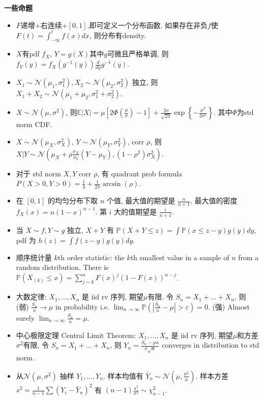 \documentclass[UTF8]{ctexart}
\begin{document}
\noindent \textbf{一些命题}
\begin{itemize}

\item $F$递增+右连续+$[0,1]$,即可定义一个分布函数.
	如果存在非负$f$使$F(t)=\int_{-\infty}^t f(x)dx$, 则分布有density.

\item $X$有pdf $f_X$, $Y=g(X)$其中$g$可微且严格单调, 则$f_Y(y)=f_X(g^{-1}(y))\frac{d}{dy}g^{-1}(y)$.

\item $X_1\sim \mathcal{N}(\mu_1,\sigma_1^2), X_2\sim \mathcal{N}(\mu_2,\sigma_2^2)$ 独立, 
	则$X_1+X_2\sim \mathcal{N}(\mu_1+\mu_2,\sigma_1^2+\sigma_2^2), $

\item $X\sim \mathcal{N}(\mu,\sigma^2)$,
	则$\mathbb{E}|X|=\mu\left[2 \Phi\left(\frac{\mu}{\sigma}\right)-1\right]+
		\frac{2 \sigma}{\sqrt{2 \pi}} \exp \left\{-\frac{\mu^{2}}{2 \sigma^{2}}\right\}$.
	其中$\Phi$为std norm CDF.

\item $X\sim\mathcal{N}(\mu_X,\sigma_X^2)$, $Y\sim\mathcal{N}(\mu_Y,\sigma_Y^2)$, corr $\rho$,
	则 $X|Y \sim \mathcal{N}\left(\mu_X+\rho\frac{\sigma_X}{\sigma_Y}(Y-\mu_Y),(1-\rho^2)\sigma_X^2\right)$.

\item 对于 std norm $X,Y$ corr $\rho$, 有 quadrant prob formula $P(X>0, Y>0) = \frac{1}{4}+\frac{1}{2\pi}\arcsin(\rho)$.

\item 在 $[0,1]$ 的均匀分布下取 $n$ 个值, 最大值的期望是 $\frac{n}{n+1}$,
最大值的密度 $f_X(x) = n(1-x)^{n-1}$.
第 $i$ 大的值期望是 $\frac{i}{n+1}$.

\item 当 $X\sim f,Y\sim g$ 独立, $X+Y$ 有
	$\mathbb{P} (X+Y\leq z)=\int\mathbb{P}(x\leq z-y)g(y)dy$,
	pdf 为 $h(z)=\int f(z-y)g(y)dy$.

\item 顺序统计量 $k$th order statistic: the $k$th smallest value in a sample of $n$ from a random distribution.
	There is $\mathbb{P}(X_{(k)}\leq x)=\sum_{j=k}^n F(x)^j (1-F(x))^{n-j}$.

\item 大数定律:
	$X_1,\dots,X_n$ 是 iid rv 序列, 期望$\mu$有限.
	令 $S_n = X_1+\dots+X_n$, 则
	(弱) $\frac{S_n}{n}\to\mu$ in probability i.e.
	$\lim_{n\to\infty}\mathbb{P}(|\frac{S_n}{n}-\mu|>\varepsilon)=0$.
	(强) Almost surely $\lim_{n\to\infty}\frac{S_n}{n}=\mu$.

\item 中心极限定理 Central Limit Theorem:
	$X_1,\dots,X_n$ 是 iid rv 序列, 期望$\mu$和方差$\sigma^2$有限,
	令 $S_n = X_1+\dots+X_n$, 则 $Y_n=\frac{S_n-\mu n}{\sigma\sqrt{n}}$
	converges in distribution to std norm.

\item 从$\mathcal{N}(\mu,\sigma^2)$ 抽样 $Y_1,...,Y_n$.
	样本均值有 $\bar{Y}_n\sim\mathcal{N}(\mu,\frac{\sigma^2}{n})$.
	样本方差 $s^2=\frac{1}{n-1}\sum(Y_i-\bar{Y}_n)^2$ 有 $(n-1)\frac{s^2}{\sigma^2} \sim \chi_{n-1}^2$.

\end{itemize}
\end{document}
